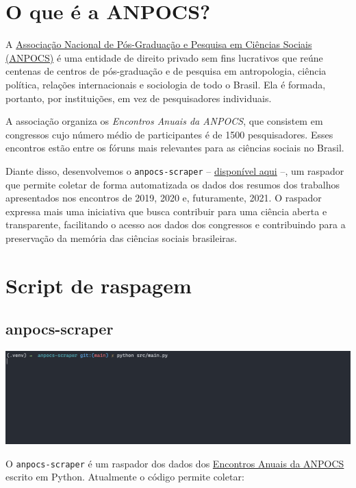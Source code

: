 \documentclass[
]{book}
\begin{document}
\hypertarget{o-que-uxe9-a-anpocs}{%
\section{O que é a ANPOCS?}\label{o-que-uxe9-a-anpocs}}

A \href{http://anpocs.com/}{Associação Nacional de Pós-Graduação e Pesquisa em Ciências Sociais (ANPOCS)} é uma entidade de direito privado sem fins lucrativos que reúne centenas de centros de pós-graduação e de pesquisa em antropologia, ciência política, relações internacionais e sociologia de todo o Brasil. Ela é formada, portanto, por instituições, em vez de pesquisadores individuais.

A associação organiza os \emph{Encontros Anuais da ANPOCS}, que consistem em congressos cujo número médio de participantes é de 1500 pesquisadores. Esses encontros estão entre os fóruns mais relevantes para as ciências sociais no Brasil.

Diante disso, desenvolvemos o \texttt{anpocs-scraper} -- \href{https://github.com/vmussa/anpocs-scraper}{disponível aqui} --, um raspador que permite coletar de forma automatizada os dados dos resumos dos trabalhos apresentados nos encontros de 2019, 2020 e, futuramente, 2021. O raspador expressa mais uma iniciativa que busca contribuir para uma ciência aberta e transparente, facilitando o acesso aos dados dos congressos e contribuindo para a preservação da memória das ciências sociais brasileiras.

\hypertarget{script-de-raspagem}{%
\section{Script de raspagem}\label{script-de-raspagem}}

\hypertarget{anpocs-scraper}{%
\subsection{anpocs-scraper}\label{anpocs-scraper}}

\includegraphics{img/demo.gif}

O \texttt{anpocs-scraper} é um raspador dos dados dos \href{http://anpocs.com/index.php/encontros/apresentacao}{Encontros Anuais da ANPOCS} escrito em Python. Atualmente o código permite coletar:
\end{document}
